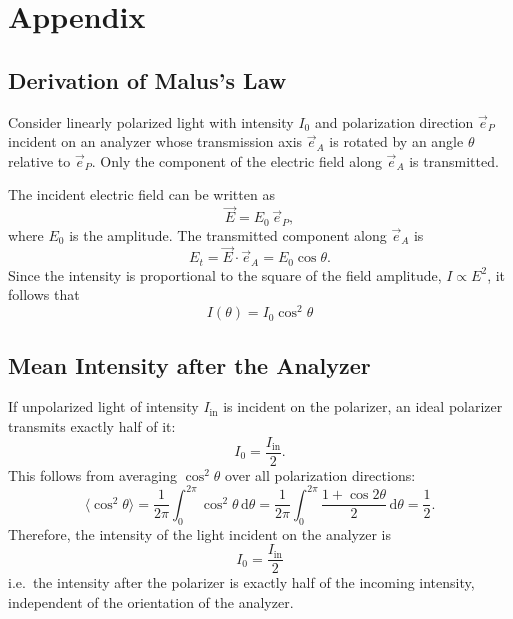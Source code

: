 \section{Appendix}

    \subsection*{Derivation of Malus's Law}
    \label{sec:derivationmalus}

Consider linearly polarized light with intensity $I_0$ and polarization direction $\vec{e}_P$
incident on an analyzer whose transmission axis $\vec{e}_A$ is rotated by an angle $\theta$
relative to $\vec{e}_P$.
Only the component of the electric field along $\vec{e}_A$ is transmitted.

The incident electric field can be written as
\begin{equation}
    \vec{E} = E_0 \, \vec{e}_P,
\end{equation}
where $E_0$ is the amplitude. The transmitted component along $\vec{e}_A$ is
\begin{equation}
    E_t = \vec{E} \cdot \vec{e}_A = E_0 \cos\theta.
\end{equation}
Since the intensity is proportional to the square of the field amplitude, $I \propto E^2$, it follows that
\begin{equation}
    I(\theta) = I_0 \cos^2\!\theta
\end{equation}

\subsection*{Mean Intensity after the Analyzer}

If unpolarized light of intensity $I_\text{in}$ is incident on the polarizer,
an ideal polarizer transmits exactly half of it:
\begin{equation}
    I_0 = \frac{I_\text{in}}{2}.
\end{equation}
This follows from averaging $\cos^2\theta$ over all polarization directions:
\begin{equation}
    \langle \cos^2\theta \rangle
    = \frac{1}{2\pi} \int_0^{2\pi} \cos^2\!\theta \, \mathrm{d}\theta
    = \frac{1}{2\pi} \int_0^{2\pi} \frac{1 + \cos 2\theta}{2} \, \mathrm{d}\theta
    = \frac{1}{2}.
\end{equation}
Therefore, the intensity of the light incident on the analyzer is
\begin{equation}
    I_0 = \frac{I_\text{in}}{2}
\end{equation}
i.e.\ the intensity after the polarizer is exactly half of the incoming intensity,
independent of the orientation of the analyzer.

